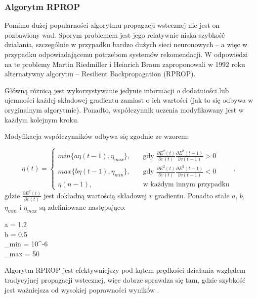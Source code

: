 \documentclass[twoside]{iisthesis}
\begin{document}
	 \subsubsection{Algorytm RPROP}		 
	 
	 Pomimo dużej popularności algorytmu propagacji wstecznej nie jest on pozbawiony wad. Sporym problemem jest jego relatywnie niska szybkość działania, szczególnie w przypadku bardzo dużych sieci neuronowych -- a więc w przypadku odpowiadającemu potrzebom systemów rekomendacji. W odpowiedzi na te problemy Martin Riedmiller i Heinrich Braun zaproponowali w 1992 roku alternatywny algorytm -- Resilient Backpropagation (RPROP).
	 
	 Główną różnicą jest wykorzystywanie jedynie informacji o dodatniości lub ujemności każdej składowej gradientu zamiast o ich wartości (jak to się odbywa w oryginalnym algorytmie). Ponadto, współczynnik uczenia modyfikowany jest w każdym kolejnym kroku. 
	 
	 Modyfikacja współczynników odbywa się zgodnie ze wzorem:
	 
	 \begin{equation}
	 \label{eq:rprop}		 
	 \eta(t) = 
	 \begin{cases}
	 min\{a \eta(t-1), \eta_{max}\}, & \quad \text{gdy } \frac{\partial E^2(t)}{\partial v(t)} \frac{\partial E^2(t-1)}{\partial v(t-1)} > 0 \\
	 max\{b \eta(t-1), \eta_{min}\}, & \quad \text{gdy } \frac{\partial E^2(t)}{\partial v(t)} \frac{\partial E^2(t-1)}{\partial v(t-1)} < 0 \\
	 \eta(n-1), & \quad \text{w każdym innym przypadku} 
	 \end{cases}		 
	 \,,
	 \end{equation}		 
	 gdzie $\frac{\partial E^2(t)}{\partial v(t)}$ jest dokładną wartością składowej $v$ gradientu. Ponadto stałe $a$, $b$, $\eta_{min}$ i $\eta_{max}$ są zdefiniowane następująco:
	 
	 \begin{conditions*}
			 	a = 1.2 \\
			 	b = 0.5 \\
			 	\eta_{min} = 10^{-6} \\
			 	\eta_{max} = 50
	 \end{conditions*} 
	 
	 Algorytm RPROP jest efektywniejszy pod kątem prędkości działania względem tradycyjnej propagacji wstecznej, więc dobrze sprawdza się tam, gdzie szybkość jest ważniejsza od wysokiej poprawności wyników \cite{riedmiller1993direct,riedmiller1994rprop}.
	 
\end{document}
